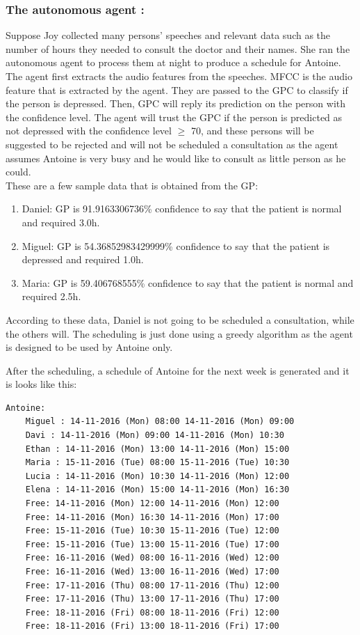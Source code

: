 \documentclass{article}
\begin{document}
    \subsubsection{The autonomous agent :}
    Suppose Joy collected many persons' speeches and relevant data such as the number of hours they needed to consult the doctor and their names. 
    She ran the autonomous agent to process them at night to produce a schedule for Antoine.
    The agent first extracts the audio features from the speeches.
    MFCC is the audio feature that is extracted by the agent. They are passed to the GPC to classify if the person is depressed. 
    Then, GPC will reply its prediction on the person with the confidence level.
    The agent will trust the GPC if the person is predicted as not depressed with the confidence level \(\geq\) 70,
    and these persons will be suggested to be rejected and will not be scheduled a consultation as the agent assumes Antoine is very busy and 
    he would like to consult as little person as he could. \\

    These are a few sample data that is obtained from the GP:
    \begin{enumerate}
         \item Daniel: GP is 91.9163306736\% confidence to say that the patient is normal and required 3.0h.
        \item Miguel: GP is 54.36852983429999\% confidence to say that the patient is depressed and required 1.0h.
        \item Maria: GP is 59.406768555\% confidence to say that the patient is normal and required 2.5h.
         \end{enumerate}

    According to these data, Daniel is not going to be scheduled a consultation, while the others will.
    The scheduling is just done using a greedy algorithm as the agent is designed to be used by Antoine only.

    After the scheduling, a schedule of Antoine for the next week is generated and it is looks like this:

	\begin{Verbatim}[fontsize=\tiny]
	Antoine:
	Miguel : 14-11-2016 (Mon) 08:00 14-11-2016 (Mon) 09:00
	Davi : 14-11-2016 (Mon) 09:00 14-11-2016 (Mon) 10:30
	Ethan : 14-11-2016 (Mon) 13:00 14-11-2016 (Mon) 15:00
	Maria : 15-11-2016 (Tue) 08:00 15-11-2016 (Tue) 10:30
	Lucia : 14-11-2016 (Mon) 10:30 14-11-2016 (Mon) 12:00
	Elena : 14-11-2016 (Mon) 15:00 14-11-2016 (Mon) 16:30
	Free: 14-11-2016 (Mon) 12:00 14-11-2016 (Mon) 12:00
	Free: 14-11-2016 (Mon) 16:30 14-11-2016 (Mon) 17:00
	Free: 15-11-2016 (Tue) 10:30 15-11-2016 (Tue) 12:00
	Free: 15-11-2016 (Tue) 13:00 15-11-2016 (Tue) 17:00
	Free: 16-11-2016 (Wed) 08:00 16-11-2016 (Wed) 12:00
	Free: 16-11-2016 (Wed) 13:00 16-11-2016 (Wed) 17:00
	Free: 17-11-2016 (Thu) 08:00 17-11-2016 (Thu) 12:00
	Free: 17-11-2016 (Thu) 13:00 17-11-2016 (Thu) 17:00
	Free: 18-11-2016 (Fri) 08:00 18-11-2016 (Fri) 12:00
	Free: 18-11-2016 (Fri) 13:00 18-11-2016 (Fri) 17:00
	\end{Verbatim}
\end{document}
